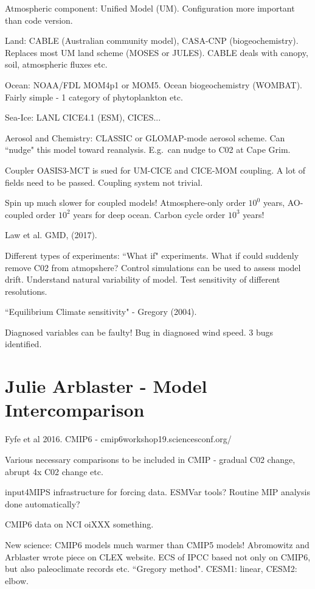 \documentclass[12pt]{article}
\begin{document}
Atmospheric component: Unified Model (UM). Configuration more important than code version. 

Land: CABLE (Australian community model), CASA-CNP (biogeochemistry). Replaces most UM land scheme (MOSES or JULES). CABLE deals with canopy, soil, atmospheric fluxes etc. 

Ocean: NOAA/FDL MOM4p1 or MOM5. Ocean biogeochemistry (WOMBAT). Fairly simple - 1 category of phytoplankton etc. 

Sea-Ice: LANL CICE4.1 (ESM), CICES...

Aerosol and Chemistry: CLASSIC or GLOMAP-mode aerosol scheme. Can ``nudge" this model toward reanalysis. E.g.~can nudge to C02 at Cape Grim. 

Coupler OASIS3-MCT is sued for UM-CICE and CICE-MOM coupling. A lot of fields need to be passed. Coupling system not trivial. 

Spin up much slower for coupled models! Atmosphere-only order $10^0$ years, AO-coupled order $10^2$ years for deep ocean. Carbon cycle order $10^3$ years!

Law et al. GMD, (2017).

Different types of experiments: ``What if" experiments. What if could suddenly remove C02 from atmopshere? Control simulations can be used to assess model drift. Understand natural variability of model. Test sensitivity of different resolutions. 

``Equilibrium Climate sensitivity" - Gregory (2004). 

Diagnosed variables can be faulty! Bug in diagnosed wind speed. 3 bugs identified.

\section{Julie Arblaster - Model Intercomparison} 
Fyfe et al 2016. CMIP6 - cmip6workshop19.sciencesconf.org/ 

Various necessary comparisons to be included in CMIP - gradual C02 change, abrupt 4x C02 change etc.

input4MIPS infrastructure for forcing data. ESMVar tools? Routine MIP analysis done automatically?

CMIP6 data on NCI oiXXX something. 

New science: CMIP6 models much warmer than CMIP5 models! Abromowitz and Arblaster wrote piece on CLEX website. ECS of IPCC based not only on CMIP6, but also paleoclimate records etc. ``Gregory method". CESM1: linear, CESM2: elbow. 
\end{document}
